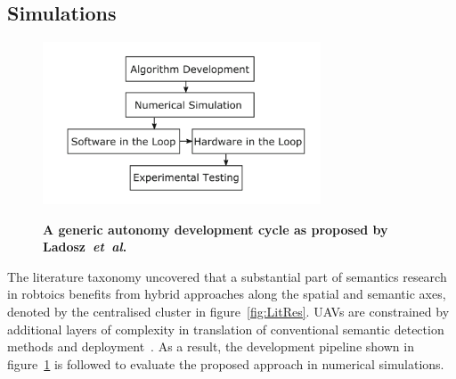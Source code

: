 \documentclass[twocolumn,letterpaper]{IEEEAerospaceCLS}  %
\newcommand{\abbreviation}[1]{\emph{#1}.}
\newcommand{\etal}{\abbreviation{et~al}}
\begin{document}
\subsection{Simulations} \label{ssec:MetSim}
\begin{figure}[h!]
    \centering
    \includegraphics[width=3.25in]{2-3DevelopmentCycle.png}\\
    \caption{\bf{A generic autonomy development cycle as proposed by Ladosz~\etal~\protect\cite{ladosz_generic_2019}}}
    \label{fig:DevProcess}
\end{figure}

The literature taxonomy uncovered that a substantial part of semantics research in robtoics benefits from hybrid approaches along the spatial and semantic axes, denoted by the centralised cluster in figure~\ref{fig:LitRes}. UAVs are constrained by additional layers of complexity in translation of conventional semantic detection methods and deployment~\cite{mandel_method_2020}. As a result, the development pipeline shown in figure~\ref{fig:DevProcess} is followed to evaluate the proposed approach in numerical simulations.
\end{document}
